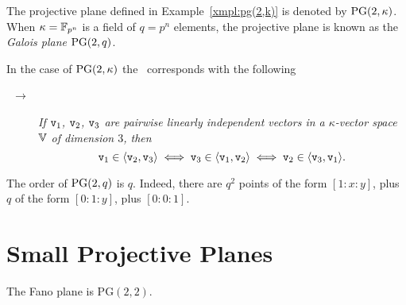\begin{ntn}
    The projective plane defined in\/ {\upshape Example~\ref{xmpl:pg(2,k)}} is denoted by\/ $\operatorname{PG}(2,\kappa)$. When\/ $\kappa=\mathbb{F}_{p^{n}}$ is a field of\/ $q=p^n$ elements, the projective plane is known as the \textsl{Galois plane}\/ $\operatorname{PG}(2,q)$.
\end{ntn}

\begin{rem}
    In the case of $\operatorname{PG}(2,\kappa)$ the \rr\ corresponds with the following
    \begin{description}
        \item[\ $\to$] 
        \textit{If\/ $\mathtt v_1$, $\mathtt v_2$, $\mathtt v_3$ are pairwise linearly independent vectors in a\/ $\kappa$-vector space\/ $\mathbb V$ of dimension\/ $3$, then}
        \[
            \mathtt v_1\in\langle\mathtt v_2,\mathtt v_3\rangle
            \iff \mathtt v_3\in\langle\mathtt v_1,\mathtt v_2\rangle
            \iff \mathtt v_2\in\langle\mathtt v_3,\mathtt v_1\rangle.
        \]
    \end{description}
\end{rem}

\begin{rem}\label{rem:order-of-galois-plane}
    The order of $\operatorname{PG}(2,q)$ is $q$. Indeed, there are $q^2$ points of the form $[1:x:y]$, plus $q$ of the form $[0:1:y]$, plus $[0:0:1]$.
\end{rem}

\section{Small Projective Planes}

\begin{prop}\label{prop:Fano=PG(2,2)}
    The Fano plane is $\mathrm{PG}(2,2)$.
\end{prop}

